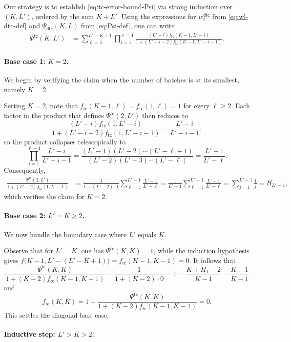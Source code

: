 \documentclass[english]{article}
\newcommand{\tc}{\mathsf{tc}}
\newcommand{\dtc}{\mathsf{dtc}}
\begin{document}
Our strategy is to establish \eqref{eq:tc-error-bound-Psi} via strong induction over $(K, L')$, ordered by the sum $K + L'$.
Using the expressions for $ w_\ell^{\dtc} $ from \eqref{eq:wl-dtc-def} and $\Psi_\dtc(K, L)$ from \eqref{eq:Psi-def}, one can write
\begin{align*}
\Psi^{\tc}(K, L') &= \sum_{\ell = 1}^{L'-K+1} \prod_{i=1}^{\ell - 1} \frac{(L'-i)f_\tc(K-1, L' - i)}{1 + (L'-i-2)f_\tc(K-1, L' - i - 1)}.
\end{align*}

\paragraph{Base case 1: $K = 2$.}
We begin by verifying the claim when the number of batches is at its smallest, namely $K = 2$.

Setting $K = 2$, note that $f_\tc(K-1, \ell) = f_\tc(1, \ell) = 1$ for every $\ell \geq 2$. Each factor in the product that defines $\Psi^{\tc}(2, L')$ then reduces to
\[
    \frac{(L'-i)f_\tc(1, L' - i)}{1 + (L'-i-2)f_\tc(1, L' - i - 1)} = \frac{L'-i}{L'-i-1},
\]
so the product collapses telescopically to
\[
    \prod_{i=1}^{\ell - 1} \frac{L'-i}{L'-i-1} = \frac{(L'-1)(L'-2)\cdots(L'-\ell+1)}{(L'-2)(L'-3)\cdots(L'-\ell)} = \frac{L'-1}{L'-\ell}.
\]
Consequently,
\begin{align*}
    \frac{\Psi^{\tc}(2, L')}{1 + (L'-2) f_\tc(1, L'-1)} &= \frac{1}{1 + (L'-2) \cdot 1} \sum_{\ell = 1}^{L'-1} \frac{L'-1}{L'-\ell} = \frac{1}{L'-1} \sum_{\ell = 1}^{L'-1} \frac{L'-1}{L'-\ell} = \sum_{j=1}^{L'-1} \frac{1}{j} = H_{L'-1},
\end{align*}
which verifies the claim for $K = 2$.

\paragraph{Base case 2: $L' = K \geq 2$.}
We now handle the boundary case where $L'$ equals $K$.

Observe that for $L' = K$, one has $\Psi^{\tc}(K, K) = 1$, while the induction hypothesis gives $f\big(K-1, L'-(L'-K+1)\big) = f_\tc(K-1, K-1) = 0$. It follows that
\[
    \frac{\Psi^{\tc}(K, K)}{1 + (K-2) f_\tc(K-1, K-1)} = \frac{1}{1 + (K-2) \cdot 0} = 1 = \frac{K + H_1 - 2}{K - 1} = \frac{K - 1}{K - 1}
\]
and 
\[
    f_\tc(K, K) = 1 - \frac{\Psi^{\tc}(K, K)}{1 + (K-2) f_\tc(K-1, K-1)} = 0.
\] 
This settles the diagonal base case.

\paragraph{Inductive step: $L' > K > 2$.}
\end{document}
